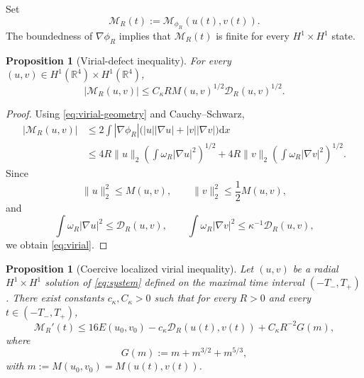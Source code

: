 \documentclass[12pt]{amsart}
\numberwithin{equation}{section}
\newtheorem{proposition}[theorem]{Proposition}
\theoremstyle{remark}
\newcommand{\R}{\mathbb{R}}
\newcommand{\dd}{\mathrm{d}x}
\begin{document}
Set
\begin{equation*}
 \mathcal M_R(t):=\mathcal M_{\phi_R}(u(t),v(t)).
\end{equation*}
The boundedness of $\nabla\phi_R$ implies that $\mathcal M_R(t)$ is finite for every $H^1\times H^1$ state.

\begin{proposition}[Virial-defect inequality]\label{prop:virial}
For every $(u,v)\in H^1(\R^4)\times H^1(\R^4)$,
\begin{equation}\label{eq:virial}
 |\mathcal M_R(u,v)| \le C_\kappa RM(u,v)^{1/2}\mathcal D_R(u,v)^{1/2}.
\end{equation}
\end{proposition}

\begin{proof}
Using \eqref{eq:virial-geometry} and Cauchy--Schwarz,
\begin{align*}
 |\mathcal M_R(u,v)|
 &\le2\int|\nabla\phi_R|
 \big(|u||\nabla u|+|v||\nabla v|\big)\dd\\
 &\le4R\|u\|_2\left(\int\omega_R|\nabla u|^2\right)^{1/2}
 +4R\|v\|_2\left(\int\omega_R|\nabla v|^2\right)^{1/2}.
\end{align*}
Since
\[
 \|u\|_2^2\le M(u,v), \qquad \|v\|_2^2\le\frac12M(u,v),
\]
and
\[
 \int\omega_R|\nabla u|^2\le\mathcal D_R(u,v),
 \qquad
 \int\omega_R|\nabla v|^2\le\kappa^{-1}\mathcal D_R(u,v),
\]
we obtain \eqref{eq:virial}.
\end{proof}


\begin{proposition}[Coercive localized virial inequality]\label{prop:coercive}
Let $(u,v)$ be a radial $H^1\times H^1$ solution of \eqref{eq:system} defined on the maximal time interval $(-T_-,T_+)$. There exist constants $c_\kappa,C_\kappa>0$ such that for every $R>0$ and every $t\in (-T_-,T_+)$,
\begin{equation}\label{eq:coercive}
 \mathcal M_R'(t)
 \le16E(u_0,v_0)-c_\kappa\mathcal D_R(u(t),v(t)) +C_\kappa R^{-2}G(m),
\end{equation}
where
\begin{equation*}
 G(m):=m+m^{3/2}+m^{5/3},
\end{equation*}
with $m:=M(u_0,v_0)=M(u(t),v(t))$.
\end{proposition}
\end{document}
